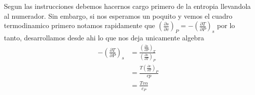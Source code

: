 \documentclass{report}
\begin{document}
\sol

Segun las instrucciones debemos hacernos cargo primero de la entropia llevandola al numerador. Sin embargo, si nos esperamos un poquito y vemos el cuadro termodinamico primero notamos rapidamente que $\left( \frac{\partial {s}}{\partial {v}} \right)_P = -\left( \frac{\partial {T}}{\partial {P}} \right)_s$ por lo tanto, desarrollamos desde ahi lo que nos deja unicamente algebra
\begin{align*}
  -\left( \frac{\partial {T}}{\partial {P}} \right)_s &= \frac{\left( \frac{\partial {s}}{\partial {P}} \right)_T}{\left( \frac{\partial {s}}{\partial {T}} \right)_P} \\
                                                     &=  \frac{T \left( \frac{\partial {v}}{\partial {T}} \right)_P}{cp} \\
                                                     &= \frac{Tv\alpha}{c_P} 
\end{align*}


\sol
\end{document}

